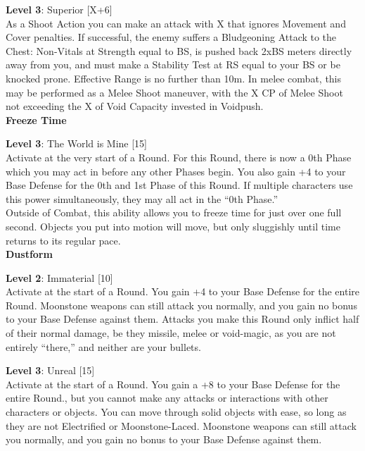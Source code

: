 \documentclass[a4paper, twocolumn, openany]{book}
\newlength{\indentlen}
\newcommand{\tabto}[1]{\setlength{\leftskip}{#1\indentlen}}
\begin{document}
{			\tabto{3}
			{\bfseries Level 3}:  Superior [X+6]\\
			As a Shoot Action you can make an attack with X that ignores Movement
			and Cover penalties. If successful, the enemy suffers a Bludgeoning Attack to the
			Chest: Non-Vitals at Strength equal to BS, is pushed back 2xBS meters directly
			away from you, and must make a Stability Test at RS equal to your BS or be
			knocked prone. Effective Range is no further than 10m. In melee combat, this
			may be performed as a Melee Shoot maneuver, with the X CP of Melee Shoot
			not exceeding the X of Void Capacity invested in Voidpush.\\

\tabto{0}
{\bfseries\large Freeze Time\\}

			\tabto{3}
			{\bfseries Level 3}: The World is Mine [15]\\
			Activate at the very start of a Round. For this Round, there is now a 0th Phase which you
			may act in before any other Phases begin. You also gain +4 to your Base Defense for
			the 0th and 1st Phase of this Round. If multiple characters use this power
			simultaneously, they may all act in the “0th Phase.”\\
			Outside of Combat, this ability allows you to freeze time for just over one full second.
			Objects you put into motion will move, but only sluggishly until time returns to its regular
			pace.\\

\tabto{0}
{\bfseries\large Dustform\\}

	\tabto{2}
	{\bfseries Level 2}:  Immaterial [10]\\
	Activate at the start of a Round. You gain +4 to your Base Defense for the entire Round.
	Moonstone weapons can still attack you normally, and you gain no bonus to your Base Defense
	against them. Attacks you make this Round only inflict half of their normal damage, be they
	missile, melee or void-magic, as you are not entirely “there,” and neither are your bullets.

		\tabto{3}
		{\bfseries Level 3}:  Unreal [15]\\
		Activate at the start of a Round. You gain a +8 to your Base Defense for
		the entire Round., but you cannot make any attacks or interactions with other
		characters or objects. You can move through solid objects with ease, so long as
		they are not Electrified or Moonstone-Laced. Moonstone weapons can still attack
		you normally, and you gain no bonus to your Base Defense against them.\\

}
\end{document}
